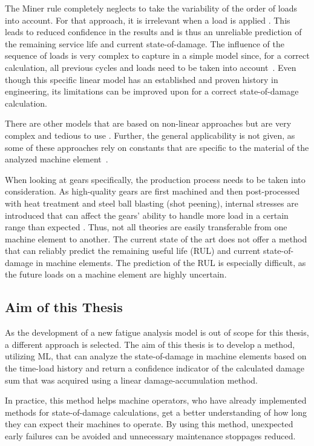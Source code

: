 The Miner rule completely neglects to take the variability of the order of loads into account. For that approach, it is irrelevant when a load is applied \cite{ISO1}. 
This leads to reduced confidence in the results and is thus an unreliable prediction of the remaining service life and current state-of-damage.
The influence of the sequence of loads is very complex to capture in a simple model since, for a correct calculation, all previous cycles and loads need to be taken into account~\cite{Vietze}. Even though this specific linear model has an established and proven history in engineering, its limitations can be improved upon for a correct state-of-damage calculation.

There are other models that are based on non-linear approaches but are very complex and tedious to use \cite{Vietze}. Further, the general applicability is not given, as some of these approaches rely on constants that are specific to the material of the analyzed machine element~\cite{Sander}.

When looking at gears specifically, the production process needs to be taken into consideration. As high-quality gears are first machined and then post-processed with heat treatment and steel ball blasting (shot peening), internal stresses are introduced that can affect the gears' ability to handle more load in a certain range than expected \cite{Benedetti}. 
Thus, not all theories are easily transferable from one machine element to another. The current state of the art does not offer a method that can reliably predict the remaining useful life (RUL) and current state-of-damage in machine elements. The prediction of the RUL is especially difficult, as the future loads on a machine element are highly uncertain.


\subsection{Aim of this Thesis}
As the development of a new fatigue analysis model is out of scope for this thesis, a different approach is selected.
The aim of this thesis is to develop a method, utilizing ML, that can analyze the state-of-damage in machine elements based on the time-load history and return a confidence indicator of the calculated damage sum that was acquired using a linear damage-accumulation method.

In practice, this method helps machine operators, who have already implemented methods for state-of-damage calculations, get a better understanding of how long they can expect their machines to operate. By using this method, unexpected early failures can be avoided and unnecessary maintenance stoppages reduced.

